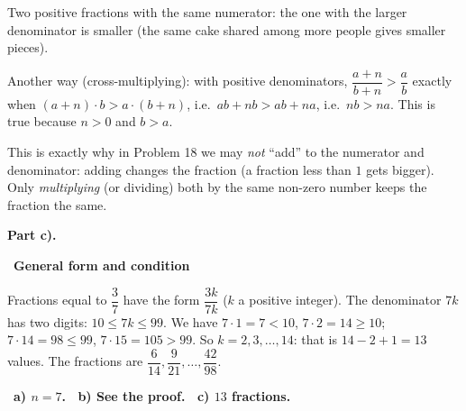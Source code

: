 \documentclass[11pt]{article}
\providecommand{\AnsWord}{Đáp số}
\newcommand{\ans}[1]{\par\smallskip{\bfseries\color{tmGreen!88!black}\AnsWord:}\ {\bfseries\color{AnsRed}#1}\par}
\newcommand{\step}[2]{\par\smallskip\noindent{\bfseries\color{tmBlue!85!black}\StepWord~#1.}\ {\bfseries #2}\par\nopagebreak}
\def\AnsWord{Answer}
\def\StepWord{Step}
\begin{document}
{\begin{recallbox}Two positive fractions with the same numerator: the one with the larger denominator is smaller (the same cake shared among more people gives smaller pieces).\end{recallbox}

\begin{proofbox}Another way (cross-multiplying): with positive denominators, $\dfrac{a+n}{b+n}>\dfrac ab$ exactly when $(a+n)\cdot b>a\cdot(b+n)$, i.e.\ $ab+nb>ab+na$, i.e.\ $nb>na$. This is true because $n>0$ and $b>a$.\end{proofbox}

\begin{warnbox}This is exactly why in Problem 18 we may \emph{not} ``add'' to the numerator and denominator: adding changes the fraction (a fraction less than $1$ gets bigger). Only \emph{multiplying} (or dividing) both by the same non-zero number keeps the fraction the same.\end{warnbox}

\par\smallskip\textbf{Part c).}
\step{6}{General form and condition}
Fractions equal to $\dfrac37$ have the form $\dfrac{3k}{7k}$ ($k$ a positive integer). The denominator $7k$ has two digits: $10\le 7k\le 99$. We have $7\cdot 1=7<10$, $7\cdot 2=14\ge 10$; $7\cdot 14=98\le 99$, $7\cdot 15=105>99$. So $k=2,3,\dots,14$: that is $14-2+1=13$ values.
The fractions are $\dfrac{6}{14},\dfrac{9}{21},\dots,\dfrac{42}{98}$.

\ans{a) $n=7$. \ b) See the proof. \ c) $13$ fractions.}
}
\end{document}
